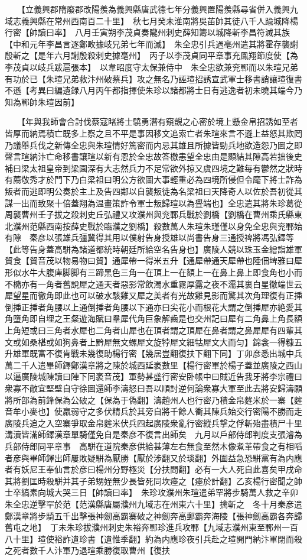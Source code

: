 　　【立義興郡隋廢郡改陽羨為義興縣唐武德七年分義興置陽羨縣尋省併入義興九域志義興縣在常州西南百二十里】　秋七月癸未淮南將吳苖帥其徒八千人踰城降楊行密【帥讀曰率】　八月壬寅朔李茂貞奏隴州刺史薛知籌以城降斬李昌符滅其族【中和元年李昌言逐鄭畋據岐兄弟七年而滅】　朱全忠引兵過亳州遣其將霍存襲謝殷斬之【是年六月謝殷殺刺史據亳州】　丙子以李茂貞同平章事充鳳翔節度使【為李茂貞以岐兵跋扈張本】　以韋昭度守太保兼侍中　朱全忠欲兼兖鄆而以朱瑄兄弟有功於已【朱瑄兄弟救汴州破蔡兵】攻之無名乃誣瑄招誘宣武軍士移書誚讓瑄復書不遜【考異曰編遺録八月丙午都指揮使朱珍以諸都將士日有逃逸者初未曉其端今乃知為鄆帥朱瑄因前】

　　【年與我師會合討伐蔡寇睹將士驍勇潛有窺覬之心密於境上懸金帛招誘如至者皆厚而納焉積亡既多上察之且不平是事因移文追索亡者朱瑄來言不遜上益怒其欺罔乃議舉兵伐之新傳全忠與朱瑄情好篤密而内忌其雄且所據皆勁兵地欲造怨乃圖之即聲言瑄納汴亡命移書讓瑄以新有恩於全忠故答檄恚望全忠由是顯結其隙高若拙後史補曰梁太祖皇帝到梁園深有大志然兵力不足常欲外掠又虞四境之難每有鬱然之狀時有薦敬秀才於門下乃白梁祖曰明公方欲圖大事輕重必為四境所侵但令麾下將士詐為叛者而逃即明公奏於主上及告四鄰以自襲叛徒為名梁祖曰天降奇人以佐於吾初從其謀一出而致聚十倍蓋翔為温畫策詐令軍士叛歸瑄以為舋端也】全忠遣其將朱珍葛從周襲曹州壬子拔之殺刺史丘弘禮又攻濮州與兖鄆兵戰於劉橋【劉橋在曹州乘氏縣東北濮州范縣西南按薛史戰於臨濮之劉橋】殺數萬人朱瑄朱瑾僅以身免全忠與兖鄆始有隙　秦彦以張雄兵彊冀得其用以僕射告身授雄以尚書告身三通授禆將馮弘鐸等【此等告身蓋高駢為諸道都統時朝廷所給空名告身也】廣陵人競以珠玉金繒詣雄軍貿食【貿音茂以物易物曰貿】通犀帶一得米五升【通犀帶通天犀帶也陸佃埤雅曰犀形似水牛大腹庳脚脚有三蹄黑色三角一在頂上一在額上一在鼻上鼻上即食角也小而不橢亦有一角者舊說犀之通天者惡影常飲濁水重霧厚露之夜不濡其裏白星徹端世云犀望星而徹角即此也可以破水駭雞又犀之美者有光故雞見影而驚其次角理復有正挿倒挿正挿者角腰以上通倒挿者角腰以下通亦曰尖花小而根花大謂之倒挿犀亦絶愛其角墮角即自埋之王粲遊海賦曰羣犀代角巨象解齒是也交州記曰犀有二角鼻上角長額上角短或曰三角者水犀也二角者山犀也在頂者謂之頂犀在鼻者謂之鼻犀犀有四輩其文或如桑椹或如狗鼻者上黔犀無文螺犀文旋㹀犀文細牯犀文大而匀】錦衾一得糠五升雄軍既富不復肯戰未幾復助楊行密【幾居豈翻復扶下翻下同】丁卯彦悉出城中兵萬二千人遣畢師鐸鄭漢章將之陳於城西延袤數里【楊行密軍於楊子蓋並廣陵之西山以逼廣陵城陳讀曰陣下同袤音茂】軍勢甚盛行密安卧帳中曰賊近告我牙將李宗禮曰衆寡不敵宜堅壁自守徐圖還師李濤怒曰吾以順討逆何論衆寡大軍至此去將安歸濤願將所部為前鋒保為公破之【保為于偽翻】濤趙州人也行密乃積金帛麰米於一寨【麰音牟小麥也】使羸弱守之多伏精兵於其旁自將千餘人衝其陳兵始交行密陽不勝而走廣陵兵追之入空寨爭取金帛麰米伏兵四起廣陵衆亂行密縱兵撃之俘斬殆盡積尸十里溝瀆皆滿師鐸漢章單騎僅免自是秦彦不復言出師矣　九月以戶部侍郎判度支張濬為兵部侍郎同平章事　高駢在道院秦彦供給甚薄左右無食至然木像煮革帶食之有相㗖者彦與畢師鐸出師屢敗疑駢為厭勝【厭於涉翻又於琰翻】外圍益急恐駢黨有為内應者有妖尼王奉仙言於彦曰楊州分野極災【分扶問翻】必有一大人死自此喜矣甲戌命其將劉匡時殺駢并其子弟甥姪無少長皆死同坎瘞之【瘞於計翻】乙亥楊行密聞之帥士卒縞素向城大哭三日【帥讀曰率】　朱珍攻濮州朱瑄遣弟罕將步騎萬人救之辛卯朱全忠逆擊罕於范【范漢縣唐屬濮州九域志在州東六十里】擒斬之　冬十月秦彦遣鄭漢章將步騎五千出擊張神劒高霸寨破之神劒奔高郵霸奔海陵【張神劒高霸各奔歸舊屯之地】　丁未朱珍拔濮州刺史朱裕奔鄆珍進兵攻鄆【九域志濮州東至鄆州一百八十里】瑄使裕詐遺珍書【遺惟季翻】約為内應珍夜引兵赴之瑄開門納汴軍閉而殺之死者數千人汴軍乃退瑄乘勝復取曹州【復扶